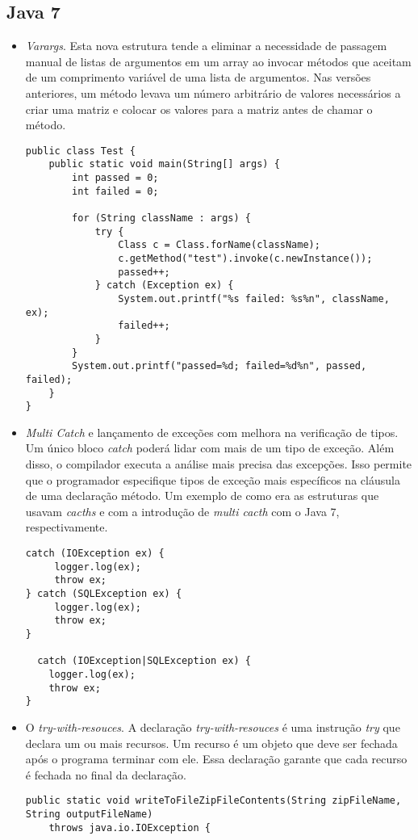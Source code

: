 \subsection {Java 7}
  \begin{itemize}
  	
  	  \item {\it Varargs}. Esta nova estrutura tende a eliminar a necessidade de passagem manual de listas de argumentos em um array ao invocar métodos que aceitam de um comprimento variável de uma lista de argumentos. Nas versões anteriores, um método levava um número arbitrário de valores necessários a  criar uma matriz e colocar os valores para a matriz antes de chamar o método.
  	  
\begin{lstlisting}
public class Test {
	public static void main(String[] args) {
		int passed = 0;
		int failed = 0;
		
		for (String className : args) {
			try {
				Class c = Class.forName(className);
				c.getMethod("test").invoke(c.newInstance());
				passed++;
			} catch (Exception ex) {
				System.out.printf("%s failed: %s%n", className, ex);
				failed++;
			}
		}
		System.out.printf("passed=%d; failed=%d%n", passed, failed);
	}
}
\end{lstlisting}
  	
  \item {\it Multi Catch} e lançamento de exceções com melhora na verificação de tipos. Um único bloco {\it catch} poderá lidar com mais de um tipo de exceção. Além disso, o compilador executa a análise mais precisa das excepções. Isso permite que o programador especifique tipos de exceção mais específicos na cláusula de uma declaração método. Um exemplo de como era as estruturas que usavam {\it cacths} e com a introdução de {\it multi cacth} com o Java 7, respectivamente.

\begin{lstlisting}
catch (IOException ex) {
     logger.log(ex);
     throw ex;
} catch (SQLException ex) {
     logger.log(ex);
     throw ex;
}

  catch (IOException|SQLException ex) {
    logger.log(ex);
    throw ex;
}
\end{lstlisting}
  
  \item O {\it try-with-resouces}. A declaração {\it try-with-resouces} é uma instrução {\it try} que declara um ou mais recursos. Um recurso é um objeto que deve ser fechada após o programa terminar com ele. Essa declaração garante que cada recurso é fechada no final da declaração.
  \begin{lstlisting}
public static void writeToFileZipFileContents(String zipFileName, 
String outputFileName)
    throws java.io.IOException {


\end{lstlisting}
\end{itemize}
